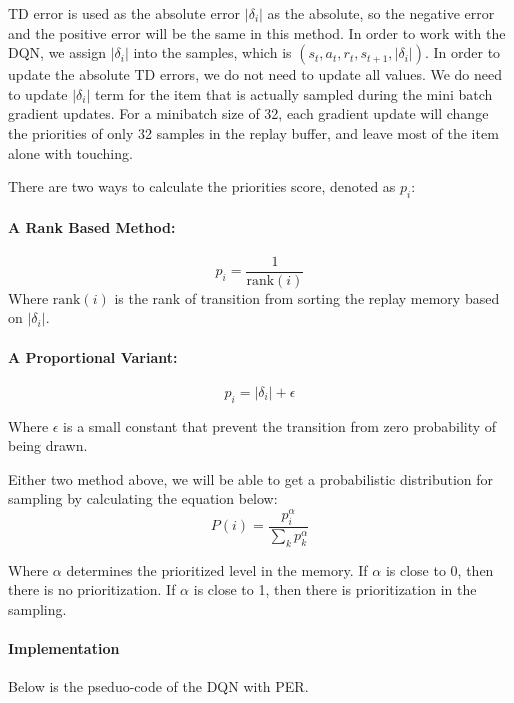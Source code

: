 \documentclass{article}
\begin{document}
TD error is used as the absolute error $|\delta_i|$ as the absolute, so the negative error and the positive error will be the same in this method. In order to work with the DQN, we assign $|\delta_i|$ into the samples, which is $(s_t,a_t,r_t,s_{t+1},|\delta_i|)$. In order to update the absolute TD errors, we do not need to update all values. We do need to update $|\delta_i|$ term for the item that is actually sampled during the mini batch gradient updates. For a minibatch size of 32, each gradient update will change the priorities of only 32 samples in the replay buffer, and leave most of the item alone with touching. \par 

There are two ways to calculate the priorities score, denoted as $p_i$:
\paragraph{A Rank Based Method:}
$$p_i = \frac{1}{\text{rank}(i)}$$
Where $\text{rank}(i)$ is the rank of transition from sorting the replay memory based on $|\delta_i|$.

\paragraph{A Proportional Variant:}
$$p_i = |\delta_i| + \epsilon$$

Where $\epsilon$ is a small constant that prevent the transition from zero probability of being drawn. \par 

Either two method above, we will be able to get a probabilistic distribution for sampling by calculating the equation below:
$$P(i) = \frac{p_i^{\alpha}}{\sum_{k}p_k^{\alpha}}$$

Where $\alpha$ determines the prioritized level in the memory. If $\alpha$ is close to 0, then there is no prioritization. If $\alpha$ is close to 1, then there is prioritization in the sampling.

\paragraph{Implementation}
Below is the pseduo-code of the DQN with PER. \par 
\end{document}
